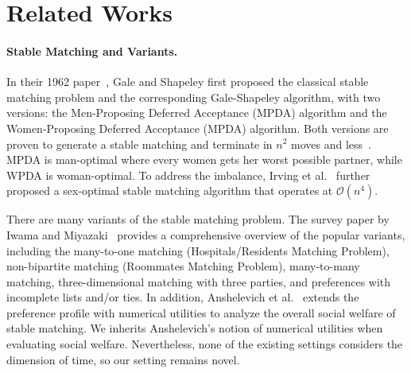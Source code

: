 \section{Related Works}
\paragraph{Stable Matching and Variants.}
In their 1962 paper~\cite{galeshapley1962}, Gale and Shapeley first proposed the classical stable matching problem and the corresponding
Gale-Shapeley algorithm, with two versions: the Men-Proposing Deferred Acceptance (MPDA) algorithm and the Women-Proposing Deferred Acceptance (MPDA) algorithm. Both versions are proven to generate a stable matching and terminate in $n^2$ moves and less~\cite{irving1989textbook}. MPDA is man-optimal where every women gets her worst possible partner, while WPDA is woman-optimal. To address the imbalance, Irving et al.~\cite{irving1987efficient} further proposed a sex-optimal stable matching algorithm that operates at $\mathcal{O}(n^4)$.

There are many variants of the stable matching problem. The survey paper by Iwama and Miyazaki~\cite{iwama2008survey} provides a comprehensive overview of the popular variants, including the many-to-one matching (Hospitals/Residents Matching Problem), non-bipartite matching (Roommates Matching Problem), many-to-many matching, three-dimensional matching with three parties, and preferences with incomplete lists and/or ties. In addition, Anshelevich et al.~\cite{Anshelevich2013} extends the preference profile with numerical utilities to analyze the overall social welfare of stable matching. We inherits Anshelevich's notion of numerical utilities when evaluating social welfare. Nevertheless, none of the existing settings considers the dimension of time, so our setting remains novel.